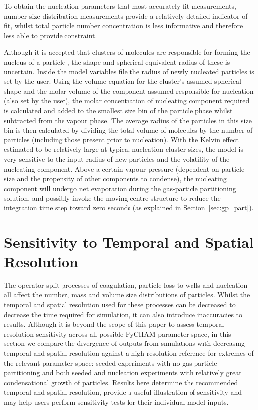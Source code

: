 \documentclass[gmd, manuscript]{copernicus}
\begin{document}
To obtain the nucleation parameters that most accurately fit measurements, number size distribution measurements provide a relatively detailed indicator of fit, whilst total particle number concentration is less informative and therefore less able to provide constraint.

Although it is accepted that clusters of molecules are responsible for forming the nucleus of a particle \citep{Seinfeld2006}, the shape and spherical-equivalent radius of these is uncertain.  Inside the model variables file the radius of newly nucleated particles is set by the user.  Using the volume equation for the cluster's assumed spherical shape and the molar volume of the component assumed responsible for nucleation (also set by the user), the molar concentration of nucleating component required is calculated and added to the smallest size bin of the particle phase whilst subtracted from the vapour phase.  The average radius of the particles in this size bin is then calculated by dividing the total volume of molecules by the number of particles (including those present prior to nucleation).  With the Kelvin effect estimated to be relatively large at typical nucleation cluster sizes, the model is very sensitive to the input radius of new particles and the volatility of the nucleating component.  Above a certain vapour pressure (dependent on particle size and the propensity of other components to condense), the nucleating component will undergo net evaporation during the gas-particle partitioning solution, and possibly invoke the moving-centre structure to reduce the integration time step toward zero seconds (as explained in Section~\ref{sec:gp_part}).

\section{Sensitivity to Temporal and Spatial Resolution}\label{sec:tr_tests}

The operator-split processes of coagulation, particle loss to walls and nucleation all affect the number, mass and volume size distributions of particles.  Whilst the temporal and spatial resolution used for these processes can be decreased to decrease the time required for simulation, it can also introduce inaccuracies to results.  Although it is beyond the scope of this paper to assess temporal resolution sensitivity across all possible PyCHAM parameter space, in this section we compare the divergence of outputs from simulations with decreasing temporal and spatial resolution against a high resolution reference for extremes of the relevant parameter space: seeded experiments with no gas-particle partitioning and both seeded and nucleation experiments with relatively great condensational growth of particles.  Results here determine the recommended temporal and spatial resolution, provide a useful illustration of sensitivity and may help users perform sensitivity tests for their individual model inputs.
\end{document}
